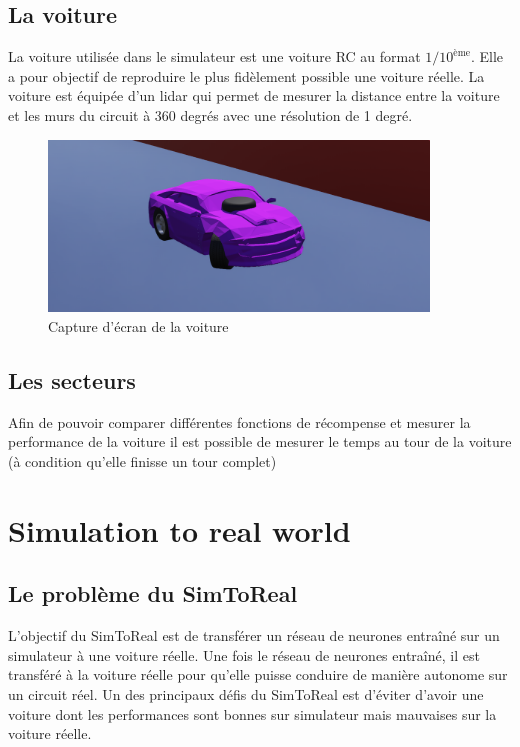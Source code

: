 \documentclass[french]{article}
\begin{document}
\subsection{La voiture}
La voiture utilisée dans le simulateur est une voiture RC au format $1/10^{\text{ème}}$. Elle a pour objectif de
reproduire le plus fidèlement possible une voiture réelle. La voiture est équipée d'un lidar qui permet de mesurer la
distance entre la voiture et les murs du circuit à 360 degrés avec une résolution de 1 degré.

\begin{figure}[H]
    \centering
    \includegraphics[width=0.9\textwidth]{Images/Voiture.png}
    \caption{Capture d'écran de la voiture}
\end{figure}

\subsection{Les secteurs}

Afin de pouvoir comparer différentes fonctions de récompense et mesurer la performance de la voiture il est possible de mesurer le temps au tour de la voiture (à condition qu'elle finisse un tour complet)


\section{Simulation to real world}

\subsection{Le problème du SimToReal}

L'objectif du SimToReal est de transférer un réseau de neurones entraîné sur un simulateur à une voiture réelle. 
Une fois le réseau de neurones entraîné, il est transféré à la voiture réelle pour qu'elle puisse conduire de manière autonome sur un circuit réel. Un des principaux défis du SimToReal est d'éviter d'avoir une voiture dont les performances sont bonnes sur simulateur mais mauvaises sur la voiture réelle.
\end{document}
